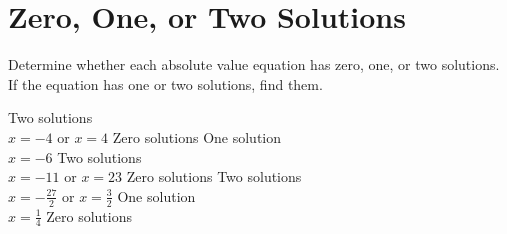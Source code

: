 %

\section*{Zero, One, or Two Solutions}
Determine whether each absolute value equation has zero, one, or two solutions.  If the equation has one or two solutions, find them.
\begin{smenum}
\mitemxxxx
{Two solutions\\$x=-4$ or $x=4$}
{Zero solutions}
{One solution\\$x=-6$}
{Two solutions\\$x=-11$ or $x=23$}
\mitemxxxx
{Zero solutions}
{Two solutions\\$x=-\frac{27}{2}$ or $x=\frac{3}{2}$}
{One solution\\$x=\frac{1}{4}$}
{Zero solutions}
\end{smenum}

